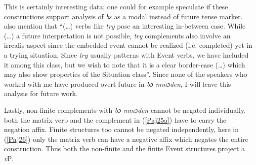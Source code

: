 \documentclass[output=paper]{langscibook}
\begin{document}
This is certainly interesting data; one could for example speculate if these constructions support \citet{owusu2014} analysis of \textit{bɛ} as a modal instead of future tense marker. \citet{wurmbrandlohninger2020} also mention that “(…) verbs like \emph{try} pose an interesting in-between case. While (…) a future interpretation is not possible, \emph{try} complements also involve an irrealis aspect since the embedded event cannot be realized (i.e. completed) yet in a trying situation. Since \emph{try} usually patterns with Event verbs, we have included it among this class, but we wish to note that it is a clear border-case (…) which may also show properties of the Situation class”. Since none of the speakers who worked with me have produced overt future in \emph{bɔ mmɔden}, I will leave this analysis for future work.

Lastly, non-finite complements with \emph{bɔ mmɔden} cannot be negated individually, both the matrix verb and the complement in (\ref{Paj25a}) have to carry the negation affix. Finite structures too cannot be negated independently, here in (\ref{Paj26}) only the matrix verb can have a negative affix which negates the entire construction. Thus both the non-finite and the finite Event structures project a \emph{v}P. 
\end{document}
